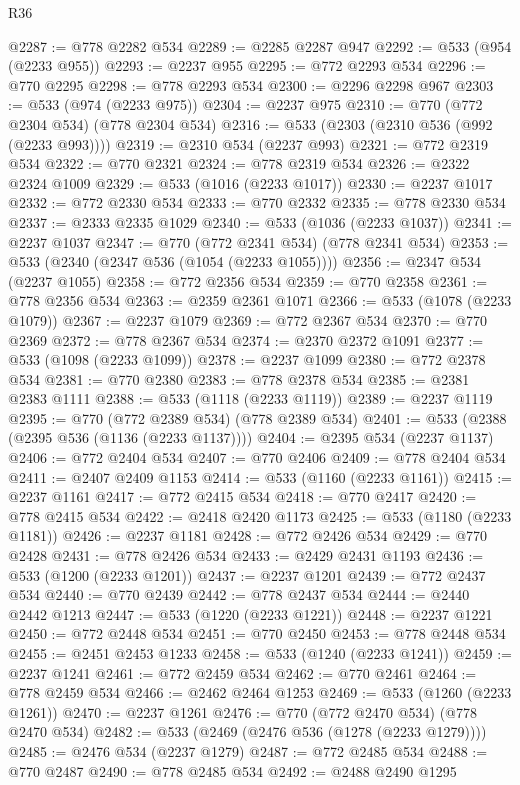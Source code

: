 \begin{lexlean}{R36}
\begin{coremodule}
@2287 := @778 @2282 @534
@2289 := @2285 @2287 @947
@2292 := @533 (@954 (@2233 @955))
@2293 := @2237 @955
@2295 := @772 @2293 @534
@2296 := @770 @2295
@2298 := @778 @2293 @534
@2300 := @2296 @2298 @967
@2303 := @533 (@974 (@2233 @975))
@2304 := @2237 @975
@2310 := @770 (@772 @2304 @534) (@778 @2304 @534)
@2316 := @533 (@2303 (@2310 @536 (@992 (@2233 @993))))
@2319 := @2310 @534 (@2237 @993)
@2321 := @772 @2319 @534
@2322 := @770 @2321
@2324 := @778 @2319 @534
@2326 := @2322 @2324 @1009
@2329 := @533 (@1016 (@2233 @1017))
@2330 := @2237 @1017
@2332 := @772 @2330 @534
@2333 := @770 @2332
@2335 := @778 @2330 @534
@2337 := @2333 @2335 @1029
@2340 := @533 (@1036 (@2233 @1037))
@2341 := @2237 @1037
@2347 := @770 (@772 @2341 @534) (@778 @2341 @534)
@2353 := @533 (@2340 (@2347 @536 (@1054 (@2233 @1055))))
@2356 := @2347 @534 (@2237 @1055)
@2358 := @772 @2356 @534
@2359 := @770 @2358
@2361 := @778 @2356 @534
@2363 := @2359 @2361 @1071
@2366 := @533 (@1078 (@2233 @1079))
@2367 := @2237 @1079
@2369 := @772 @2367 @534
@2370 := @770 @2369
@2372 := @778 @2367 @534
@2374 := @2370 @2372 @1091
@2377 := @533 (@1098 (@2233 @1099))
@2378 := @2237 @1099
@2380 := @772 @2378 @534
@2381 := @770 @2380
@2383 := @778 @2378 @534
@2385 := @2381 @2383 @1111
@2388 := @533 (@1118 (@2233 @1119))
@2389 := @2237 @1119
@2395 := @770 (@772 @2389 @534) (@778 @2389 @534)
@2401 := @533 (@2388 (@2395 @536 (@1136 (@2233 @1137))))
@2404 := @2395 @534 (@2237 @1137)
@2406 := @772 @2404 @534
@2407 := @770 @2406
@2409 := @778 @2404 @534
@2411 := @2407 @2409 @1153
@2414 := @533 (@1160 (@2233 @1161))
@2415 := @2237 @1161
@2417 := @772 @2415 @534
@2418 := @770 @2417
@2420 := @778 @2415 @534
@2422 := @2418 @2420 @1173
@2425 := @533 (@1180 (@2233 @1181))
@2426 := @2237 @1181
@2428 := @772 @2426 @534
@2429 := @770 @2428
@2431 := @778 @2426 @534
@2433 := @2429 @2431 @1193
@2436 := @533 (@1200 (@2233 @1201))
@2437 := @2237 @1201
@2439 := @772 @2437 @534
@2440 := @770 @2439
@2442 := @778 @2437 @534
@2444 := @2440 @2442 @1213
@2447 := @533 (@1220 (@2233 @1221))
@2448 := @2237 @1221
@2450 := @772 @2448 @534
@2451 := @770 @2450
@2453 := @778 @2448 @534
@2455 := @2451 @2453 @1233
@2458 := @533 (@1240 (@2233 @1241))
@2459 := @2237 @1241
@2461 := @772 @2459 @534
@2462 := @770 @2461
@2464 := @778 @2459 @534
@2466 := @2462 @2464 @1253
@2469 := @533 (@1260 (@2233 @1261))
@2470 := @2237 @1261
@2476 := @770 (@772 @2470 @534) (@778 @2470 @534)
@2482 := @533 (@2469 (@2476 @536 (@1278 (@2233 @1279))))
@2485 := @2476 @534 (@2237 @1279)
@2487 := @772 @2485 @534
@2488 := @770 @2487
@2490 := @778 @2485 @534
@2492 := @2488 @2490 @1295

\end{coremodule}
\end{lexlean}
